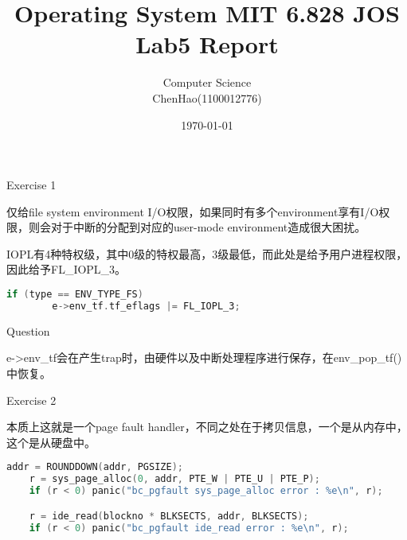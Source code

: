\documentclass[GBK,winfonts,a4paper,10pt]{ctexart}
\begin{document}
\rhead{}
\lhead{}
\cfoot{\thepage}
\renewcommand{\footrulewidth}{0.4pt}
\renewcommand{\algorithmicrequire}{\textbf{Input:}}
\renewcommand{\algorithmicensure}{\textbf{Output:}}
\setlength{\tabcolsep}{2pt}

\setlength{\parindent}{2em}

\thispagestyle{fancy}


\title{Operating System MIT 6.828 JOS Lab5 Report}
\author{Computer Science \\ ChenHao(1100012776) }
\date{\today}
\maketitle

\thispagestyle{fancy}

\tableofcontents

\newpage

\begin{section}{ Exercise 1 }
\par
仅给file system environment I/O权限，如果同时有多个environment享有I/O权限，则会对于中断的分配到对应的user-mode environment造成很大困扰。
\par
IOPL有4种特权级，其中0级的特权最高，3级最低，而此处是给予用户进程权限，因此给予FL\_IOPL\_3。
\begin{lstlisting}[language=C]
    if (type == ENV_TYPE_FS)
        e->env_tf.tf_eflags |= FL_IOPL_3;        
\end{lstlisting}
\end{section}

\begin{section}{ Question }
\par
e->env\_tf会在产生trap时，由硬件以及中断处理程序进行保存，在env\_pop\_tf()中恢复。
\end{section}

\begin{section}{ Exercise 2 }
\par
本质上这就是一个page fault handler，不同之处在于拷贝信息，一个是从内存中，这个是从硬盘中。
\begin{lstlisting}[language=C]
    	addr = ROUNDDOWN(addr, PGSIZE);
	r = sys_page_alloc(0, addr, PTE_W | PTE_U | PTE_P);
	if (r < 0) panic("bc_pgfault sys_page_alloc error : %e\n", r);

	r = ide_read(blockno * BLKSECTS, addr, BLKSECTS);
	if (r < 0) panic("bc_pgfault ide_read error : %e\n", r);       
\end{lstlisting}
\end{section}
\end{document}

